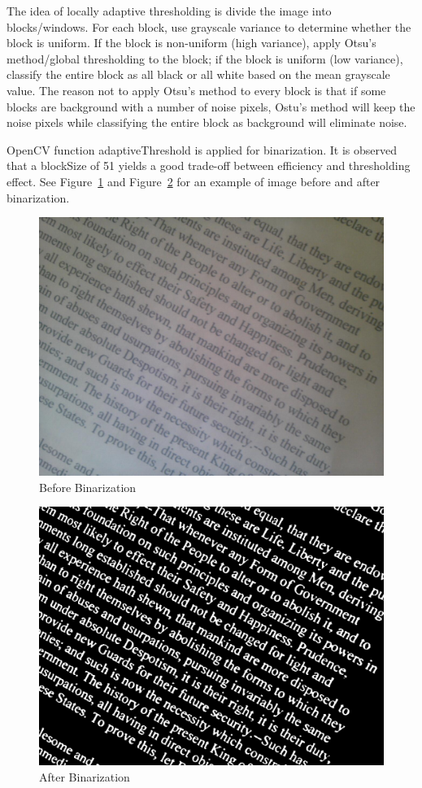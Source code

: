 \documentclass[conference]{IEEEtran}
\begin{document}
The idea of locally adaptive thresholding is divide the image into blocks/windows.  For each block, use grayscale variance to determine whether the block is uniform.  If the block is non-uniform (high variance), apply Otsu's method/global thresholding to the block; if the block is uniform (low variance), classify the entire block as all black or all white based on the mean grayscale value.  The reason not to apply Otsu's method to every block is that if some blocks are background with a number of noise pixels, Ostu's method will keep the noise pixels while classifying the entire block as background will eliminate noise.

OpenCV function adaptiveThreshold is applied for binarization.  It is observed that a blockSize of 51 yields a good trade-off between efficiency and thresholding effect.  See Figure~\ref{noskew} and Figure~\ref{noskewbinarized} for an example of image before and after binarization.

\begin{figure}
\center
\includegraphics[scale=0.15]{test261.jpg}
\caption{Before Binarization}
\label{noskew}
\end{figure}

\begin{figure}
\center
\includegraphics[scale=0.15]{src_image.jpg}
\caption{After Binarization}
\label{noskewbinarized}
\end{figure}
\end{document}
